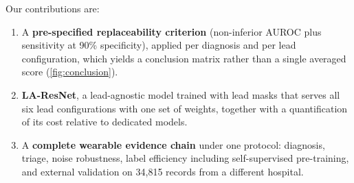 Our contributions are:
\begin{enumerate}
  \item A \textbf{pre-specified replaceability criterion} (non-inferior AUROC plus sensitivity at 90\% specificity), applied per diagnosis and per lead configuration, which yields a conclusion matrix rather than a single averaged score (\cref{fig:conclusion}).
  \item \textbf{LA-ResNet}, a lead-agnostic model trained with lead masks that serves all six lead configurations with one set of weights, together with a quantification of its cost relative to dedicated models.
  \item A \textbf{complete wearable evidence chain} under one protocol: diagnosis, triage, noise robustness, label efficiency including self-supervised pre-training, and external validation on 34,815 records from a different hospital.
\end{enumerate}
